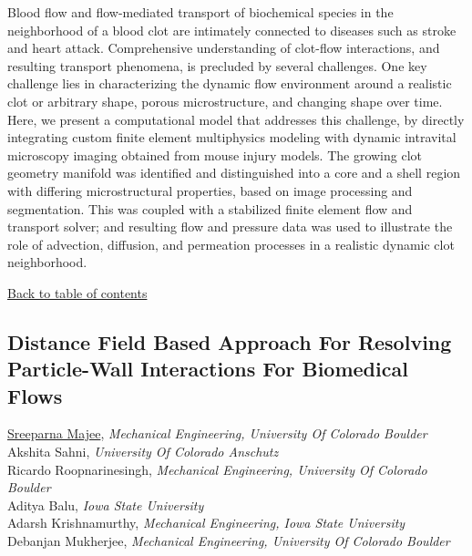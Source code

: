 \noindent Blood flow and flow-mediated transport of biochemical species in the neighborhood of a blood clot are intimately connected to diseases such as stroke and heart attack. Comprehensive understanding of clot-flow interactions, and resulting transport phenomena, is precluded by several challenges. One key challenge lies in characterizing the dynamic flow environment around a realistic clot or arbitrary shape, porous microstructure, and changing shape over time. Here, we present a computational model that addresses this challenge, by directly integrating custom finite element multiphysics modeling with dynamic intravital microscopy imaging obtained from mouse injury models. The growing clot geometry manifold was identified and distinguished into a core and a shell region with differing microstructural properties, based on image processing and segmentation. This was coupled with a stabilized finite element flow and transport solver; and resulting flow and pressure data was used to illustrate the role of advection, diffusion, and permeation processes in a realistic dynamic clot neighborhood. \\ 
\begin{flushright}\vspace{-0.2 in}\hyperlink{toc}{Back to table of contents}\end{flushright}\vspace{-0.2 in}
\hypertarget{SreeparnaMajee}{\subsection*{\color{CUGOLD} Distance Field Based Approach For Resolving Particle-Wall Interactions For Biomedical Flows}} \vsp 
\underline{Sreeparna Majee}, \textit{Mechanical Engineering, University Of Colorado Boulder}\\ 
{Akshita Sahni}, \textit{University Of Colorado Anschutz}\\ 
{Ricardo Roopnarinesingh}, \textit{Mechanical Engineering, University Of Colorado Boulder}\\ 
{Aditya Balu}, \textit{Iowa State University}\\ 
{Adarsh Krishnamurthy}, \textit{Mechanical Engineering, Iowa State University}\\ 
{Debanjan Mukherjee}, \textit{Mechanical Engineering, University Of Colorado Boulder}\\ 
\vspace{-0.1 in} \\ 
